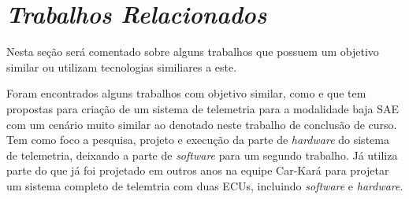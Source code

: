 \chapter{\textit{Trabalhos Relacionados}}
	\label{ch:trabalhos}
Nesta seção será comentado sobre alguns trabalhos que possuem um objetivo similar ou utilizam tecnologias similiares a este. 

Foram encontrados alguns trabalhos com objetivo similar, como \cite{Dias2010} e \cite{Nunes2016} que tem propostas para criação de um sistema de telemetria para a modalidade baja SAE com um cenário muito similar ao denotado neste trabalho de conclusão de curso. \cite{Dias2010} Tem como foco a pesquisa, projeto e execução da parte de \textit{hardware} do sistema de telemetria, deixando a parte de \textit{software} para um segundo trabalho. Já \cite{Nunes2016} utiliza parte do que já foi projetado em outros anos na equipe Car-Kará para projetar um sistema completo de telemtria com duas ECUs, incluindo \textit{software} e \textit{hardware}.  

